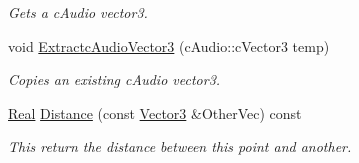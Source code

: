 \begin{DoxyCompactItemize}
\begin{DoxyCompactList}\small\item\em Gets a cAudio vector3. \item\end{DoxyCompactList}\item 
void \hyperlink{classphys_1_1Vector3_aa12021e9cdc092c8628ced1c5910c04c}{ExtractcAudioVector3} (cAudio::cVector3 temp)
\begin{DoxyCompactList}\small\item\em Copies an existing cAudio vector3. \item\end{DoxyCompactList}\item 
\hyperlink{namespacephys_af7eb897198d265b8e868f45240230d5f}{Real} \hyperlink{classphys_1_1Vector3_af59a586331fe9497056b7e0f207658a3}{Distance} (const \hyperlink{classphys_1_1Vector3}{Vector3} \&OtherVec) const 
\begin{DoxyCompactList}\small\item\em This return the distance between this point and another. \item\end{DoxyCompactList}\end{DoxyCompactItemize}
